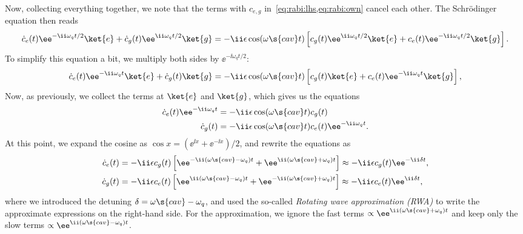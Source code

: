 \documentclass[fontsize=9pt,twoside=semi,bookmarkpackage=false]{scrartcl}
\begin{document}
Now, collecting everything together, we note that the terms with $c_{e,g}$ in~\cref{eq:rabi:lhs,eq:rabi:own} cancel each other.
The Schrödinger equation then reads
\begin{equation}
  \dot c_e (t) \ee^{ - \ii \omega_q t / 2 } \ket{ e }
  +
  \dot c_g (t) \ee^{ \ii \omega_q t / 2 } \ket{ g } =
  - \ii \epsilon \cos ( \omega\s{cav} t )
  \left[
  c_g (t) \ee^{ \ii \omega_q t / 2 } \ket{ e }
  +
  c_e (t) \ee^{ - \ii \omega_q t / 2 } \ket{ g }
  \right].
\end{equation}
To simplify this equation a bit, we multiply both sides by $\ee^{ - \ii \omega_ q t / 2 }$:
\begin{equation}
  \dot c_e (t) \ee^{ - \ii \omega_q t} \ket{ e }
  +
  \dot c_g (t) \ket{ g } =
  - \ii \epsilon
  \cos( \omega\s{cav} t )
  \left[
  c_g (t) \ket{ e }
  +
  c_e (t) \ee^{ - \ii \omega_q t } \ket{ g }
  \right],
\end{equation}
Now, as previously, we collect the terms at $\ket{ e}$ and $\ket{ g }$, which gives us the equations
\begin{align}
  \dot c_e (t) \ee^{ - \ii \omega_q  t }
  & =
  - \ii \epsilon \cos ( \omega\s{cav} t ) c_g (t)
  \\
  \dot c_g (t)
  & =
  - \ii \epsilon \cos ( \omega\s{cav} t ) c_e (t) \ee^{ - \ii\omega_q t }.
\end{align}
At this point, we expand the cosine as $\cos x = ( \ee^{ \ii x } + \ee^{ - \ii x } ) / 2 $, and rewrite the equations as
\begin{align}
  \label{eq:rabi:cedot}
  \dot c_e (t) & =
  - \ii \epsilon c_g (t)
  \left[
    \ee^{ - \ii ( \omega\s{cav} - \omega_q ) t }
    +
    \ee^{ \ii ( \omega\s{cav} + \omega_q ) t }
  \right]
  \approx
  - \ii \epsilon c_g (t) \ee^{ - \ii \delta t }
  ,
  \\
  \dot c_g (t) & =
  - \ii \epsilon c_e (t)
  \left[
    \ee^{ \ii ( \omega\s{cav} - \omega_q ) t }
    +
    \ee^{ - \ii ( \omega\s{cav} + \omega_q ) t }
  \right]
  \approx
  - \ii \epsilon c_e (t) \ee^{ \ii \delta t }
  ,
\end{align}
where we introduced the detuning $\delta = \omega\s{cav} - \omega_q$, and used the so-called \emph{Rotating wave approximation (RWA)} to write the approximate expressions on the right-hand side.
For the approximation, we ignore the fast terms $\propto \ee^{ \ii ( \omega\s{cav} + \omega_q ) t }$  and keep only the slow terms $\propto \ee^{ \ii ( \omega\s{cav} - \omega_q ) t }$.
\end{document}
